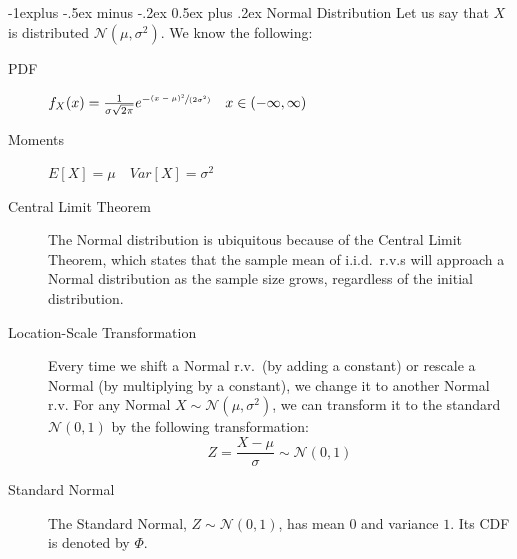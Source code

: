 \documentclass[10pt,landscape]{article}
\makeatletter
\newcommand{\N}{\mathcal{N}}
\renewcommand{\subsection}{\@startsection{subsection}{2}{0mm}%
{-1explus -.5ex minus -.2ex}%
{0.5ex plus .2ex}%
{\normalfont\normalsize\bfseries}}
\makeatother
\begin{document}
\begin{multicols*}{3}
\begin{description}



        \end{description}

        \subsection{Normal Distribution} Let us say that $X$ is distributed $\N(\mu, \sigma^2)$. We know the following:
        \begin{description}
            \item[PDF] $f_X(x) = \frac{1}{\sigma \sqrt{2\pi}} e^{-\sfrac{(x - \mu)^2}{(2 \sigma^2)}} \quad x \in (-\infty, \infty)$
            \item[Moments] $E[X]=\mu \quad Var[X] = \sigma^2$
            \item[Central Limit Theorem] The Normal distribution is ubiquitous because of the Central Limit Theorem, which states that the sample mean of i.i.d.~r.v.s will approach a Normal distribution as the sample size grows, regardless of the initial distribution.
            \item[Location-Scale Transformation] Every time we shift a Normal r.v.~(by adding a constant) or rescale a Normal (by multiplying by a constant), we change it to another Normal r.v. For any Normal $X \sim \N(\mu, \sigma^2)$, we can transform it to the standard $\N(0, 1)$ by the following transformation:
            \[Z= \frac{X - \mu}{\sigma} \sim \N(0, 1) \]
            \item[Standard Normal] The Standard Normal, $Z \sim \N(0, 1)$, has mean $0$ and variance $1$. Its CDF is denoted by $\Phi$.
        \end{description}


\end{multicols*}
\end{document}
